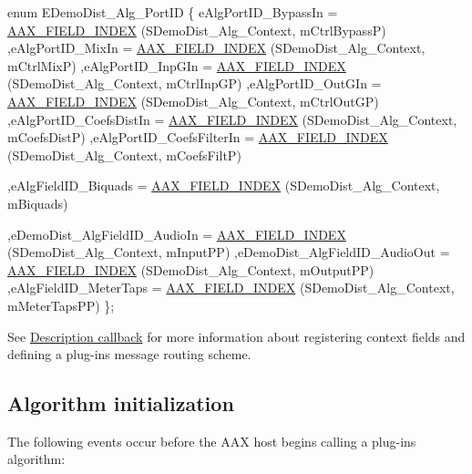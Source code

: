 \begin{DoxyCode}
\textcolor{keyword}{enum} EDemoDist\_Alg\_PortID
\{
     eAlgPortID\_BypassIn                    = \hyperlink{a00149_acf807247ecd6e5899dc9dc31644e9a1d}{AAX\_FIELD\_INDEX} (SDemoDist\_Alg\_Context, 
      mCtrlBypassP)
    ,eAlgPortID\_MixIn                       = \hyperlink{a00149_acf807247ecd6e5899dc9dc31644e9a1d}{AAX\_FIELD\_INDEX} (SDemoDist\_Alg\_Context, 
      mCtrlMixP)
    ,eAlgPortID\_InpGIn                      = \hyperlink{a00149_acf807247ecd6e5899dc9dc31644e9a1d}{AAX\_FIELD\_INDEX} (SDemoDist\_Alg\_Context, 
      mCtrlInpGP)
    ,eAlgPortID\_OutGIn                      = \hyperlink{a00149_acf807247ecd6e5899dc9dc31644e9a1d}{AAX\_FIELD\_INDEX} (SDemoDist\_Alg\_Context, 
      mCtrlOutGP)
    ,eAlgPortID\_CoefsDistIn                 = \hyperlink{a00149_acf807247ecd6e5899dc9dc31644e9a1d}{AAX\_FIELD\_INDEX} (SDemoDist\_Alg\_Context, 
      mCoefsDistP)
    ,eAlgPortID\_CoefsFilterIn               = \hyperlink{a00149_acf807247ecd6e5899dc9dc31644e9a1d}{AAX\_FIELD\_INDEX} (SDemoDist\_Alg\_Context, 
      mCoefsFiltP)

    ,eAlgFieldID\_Biquads                    = \hyperlink{a00149_acf807247ecd6e5899dc9dc31644e9a1d}{AAX\_FIELD\_INDEX} (SDemoDist\_Alg\_Context, 
      mBiquads)

    ,eDemoDist\_AlgFieldID\_AudioIn           = \hyperlink{a00149_acf807247ecd6e5899dc9dc31644e9a1d}{AAX\_FIELD\_INDEX} (SDemoDist\_Alg\_Context, 
      mInputPP)
    ,eDemoDist\_AlgFieldID\_AudioOut          = \hyperlink{a00149_acf807247ecd6e5899dc9dc31644e9a1d}{AAX\_FIELD\_INDEX} (SDemoDist\_Alg\_Context, 
      mOutputPP)
    ,eAlgFieldID\_MeterTaps                  = \hyperlink{a00149_acf807247ecd6e5899dc9dc31644e9a1d}{AAX\_FIELD\_INDEX} (SDemoDist\_Alg\_Context, 
      mMeterTapsPP)
\};
\end{DoxyCode}


 See \hyperlink{a00326}{Description callback} for more information about registering context fields and defining a plug-\/in\textquotesingle{}s message routing scheme. 

 \hypertarget{a00327_alg_initialization}{}\subsection{Algorithm initialization}\label{a00327_alg_initialization}
 The following events occur before the A\+A\+X host begins calling a plug-\/in\textquotesingle{}s algorithm\+:

